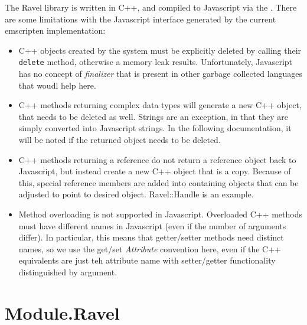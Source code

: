 \documentclass{article}
\begin{document}
The Ravel library is written in C++, and compiled to Javascript via
the . There are some
limitations with the Javascript interface generated by the current
emscripten implementation:
\begin{itemize}
\item C++ objects created by the system must be explicitly deleted by
calling their \verb+delete+ method, otherwise a memory leak
results. Unfortunately, Javascript has no concept of {\em finalizer}
that is present in other garbage collected languages that woudl help
here.
\item C++ methods returning complex data types will generate a new C++
object, that needs to be deleted as well. Strings are an exception, in
that they are simply converted into Javascript strings. In the following
documentation, it will be noted if the returned object needs to be
deleted.
\item C++ methods returning a reference do not return a reference
object back to Javascript, but instead create a new C++ object that is
a copy. Because of this, special reference members are added into
containing objects that can be adjusted to point to desired
object. Ravel::Handle is an example.
\item Method overloading is not supported in Javascript. Overloaded
C++ methods must have different names in Javascript (even if the
number of arguments differ). In particular, this means that
getter/setter methods need distinct names, so we use the get/set{\em
Attribute} convention here, even if the C++ equivalents are just teh
attribute name with setter/getter functionality distinguished by argument.
\end{itemize}

\section{Module.Ravel}
\end{document}
